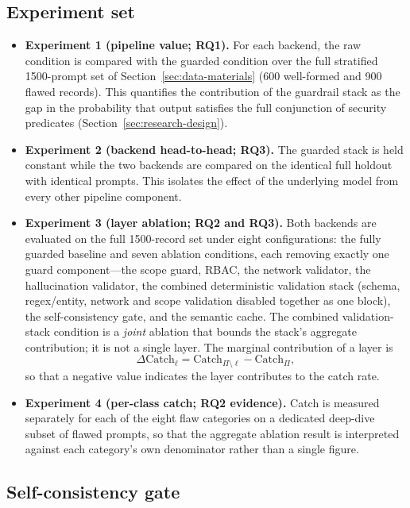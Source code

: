 \subsection*{Experiment set}

\begin{itemize}
\item \textbf{Experiment 1 (pipeline value; RQ1).} For each backend, the raw
condition is compared with the guarded condition over the full stratified
1500-prompt set of Section~\ref{sec:data-materials} (600 well-formed and 900
flawed records). This quantifies the contribution of the guardrail stack as the
gap in the probability that output satisfies the full conjunction of security
predicates (Section~\ref{sec:research-design}).
\item \textbf{Experiment 2 (backend head-to-head; RQ3).} The guarded stack is
held constant while the two backends are compared on the identical full
holdout with identical prompts. This isolates the effect of the underlying model
from every other pipeline component.
\item \textbf{Experiment 3 (layer ablation; RQ2 and RQ3).} Both backends are
evaluated on the full 1500-record set under eight configurations: the fully
guarded baseline and seven ablation conditions, each removing exactly one guard
component---the scope guard, RBAC, the network validator, the hallucination
validator, the combined deterministic validation stack (schema, regex/entity,
network and scope validation disabled together as one block), the
self-consistency gate, and the semantic cache. The combined validation-stack
condition is a \emph{joint} ablation that bounds the stack's aggregate
contribution; it is not a single layer. The marginal contribution of a layer is
\begin{equation}
\Delta\mathrm{Catch}_{\ell}=\mathrm{Catch}_{\Pi\setminus\ell}
-\mathrm{Catch}_{\Pi},
\label{eq:delta-catch}
\end{equation}
so that a negative value indicates the layer contributes to the catch rate.
\item \textbf{Experiment 4 (per-class catch; RQ2 evidence).} Catch is measured
separately for each of the eight flaw categories on a dedicated deep-dive subset
of flawed prompts, so that the aggregate ablation result is interpreted against
each category's own denominator rather than a single figure.
\end{itemize}

\subsection*{Self-consistency gate}

